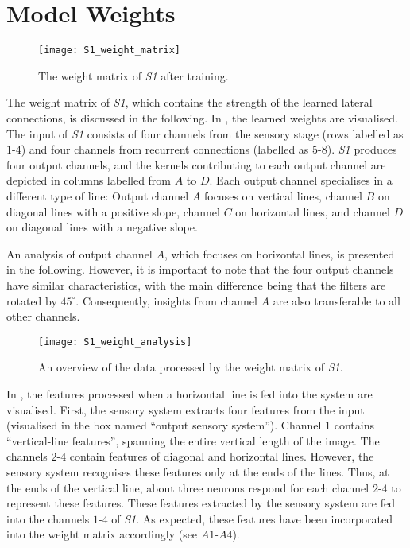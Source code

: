 \section{Model Weights}
%
\begin{figure}[h]
    \centering
    \texttt{[image: S1\_weight\_matrix]}
    \caption[Weight matrix of \emph{S1} after training]{The weight matrix of \emph{S1} after training.}
\end{figure}
%
The weight matrix of \emph{S1}, which contains the strength of the learned lateral connections, is discussed in the following.
In , the learned weights are visualised. 
The input of \emph{S1} consists of four channels from the sensory stage (rows labelled as $1$-$4$) and four channels from recurrent connections (labelled as $5$-$8$).
\emph{S1} produces four output channels, and the kernels contributing to each output channel are depicted in columns labelled from $A$ to $D$.
Each output channel specialises in a different type of line: Output channel $A$ focuses on vertical lines, channel $B$ on diagonal lines with a positive slope, channel $C$ on horizontal lines, and channel $D$ on diagonal lines with a negative slope.

An analysis of output channel $A$, which focuses on horizontal lines, is presented in the following.
However, it is important to note that the four output channels have similar characteristics, with the main difference being that the filters are rotated by $45^{\circ}$. Consequently, insights from channel $A$ are also transferable to all other channels.

\begin{figure}[h]
    \centering
    \texttt{[image: S1\_weight\_analysis]}
    \caption[Analysis of the data processed by the weight matrix \emph{S1}]{An overview of the data processed by the weight matrix of \emph{S1}.}
\end{figure}
%
In , the features processed when a horizontal line is fed into the system are visualised.
First, the sensory system extracts four features from the input (visualised in the box named ``output sensory system'').
Channel $1$ contains ``vertical-line features'', spanning the entire vertical length of the image. 
The channels $2$-$4$ contain features of diagonal and horizontal lines. However, the sensory system recognises these features only at the ends of the lines.
Thus, at the ends of the vertical line, about three neurons respond for each channel $2$-$4$ to represent these features.
These features extracted by the sensory system are fed into the channels $1$-$4$ of \emph{S1}.
As expected, these features have been incorporated into the weight matrix accordingly (see $A1$-$A4$).

